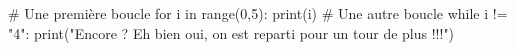 \documentclass[french]{article}
\begin{document}
\begin{boxPython}
    # Une première boucle
    for i in range(0,5):
    print(i)
    # Une autre boucle
    while i != "4":
    print("Encore ? Eh bien oui, on est reparti pour un  tour de plus !!!")
\end{boxPython}
\end{document}
